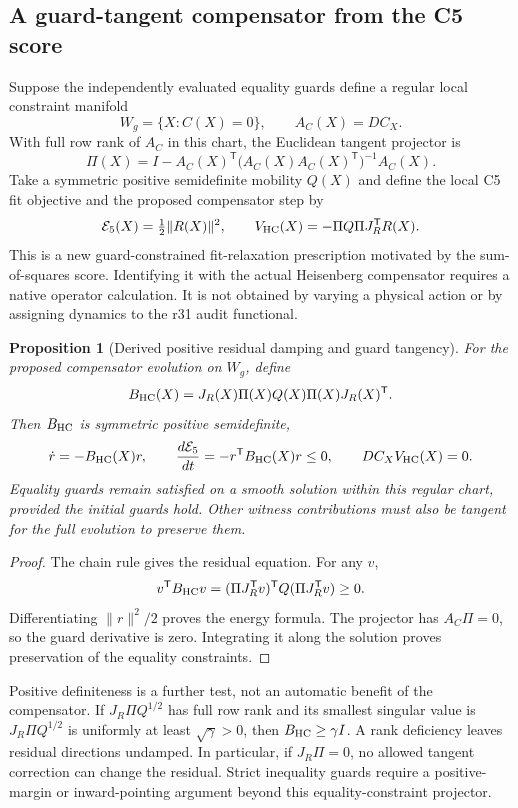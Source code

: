 \documentclass[11pt,a4paper]{article}
\newtheorem{proposition}{Proposition}
\begin{document}
\subsection{A guard-tangent compensator from the C5 score}
Suppose the independently evaluated equality guards define a regular local
constraint manifold
\[
W_g=\{X:C(X)=0\},\qquad A_C(X)=DC_X.
\]
With full row rank of $A_C$ in this chart, the Euclidean tangent projector is
\[
\Pi(X)=I-A_C(X)^{\mathsf T}
\bigl(A_C(X)A_C(X)^{\mathsf T}\bigr)^{-1}A_C(X).
\]
Take a symmetric positive semidefinite mobility $Q(X)$ and define the
local C5 fit objective and the proposed compensator step by
\[
\mathcal E_5(X)=\tfrac12\|R(X)\|^2,
\qquad V_{\rm HC}(X)=-\Pi Q\Pi J_R^{\mathsf T}R(X).
\]
This is a new guard-constrained fit-relaxation prescription motivated by
the sum-of-squares score. Identifying it with the actual Heisenberg
compensator requires a native operator calculation. It is not obtained by
varying a physical action or by assigning dynamics to the r31 audit functional.

\begin{proposition}[Derived positive residual damping and guard tangency]
\label{prop:projected-hc-damping}
For the proposed compensator evolution on $W_g$, define
\[
B_{\rm HC}(X)=J_R(X)\Pi(X)Q(X)\Pi(X)J_R(X)^{\mathsf T}.
\]
Then $B_{\rm HC}$ is symmetric positive semidefinite,
\[
\dot r=-B_{\rm HC}(X)r,\qquad
\frac{d\mathcal E_5}{dt}=-r^{\mathsf T}B_{\rm HC}(X)r\le0,
\qquad DC_X V_{\rm HC}(X)=0.
\]
Equality guards remain satisfied on a smooth solution within this regular
chart, provided the initial guards hold. Other witness contributions must
also be tangent for the full evolution to preserve them.
\end{proposition}
\begin{proof}
The chain rule gives the residual equation. For any $v$,
\[
v^{\mathsf T}B_{\rm HC}v
=(\Pi J_R^{\mathsf T}v)^{\mathsf T}Q(\Pi J_R^{\mathsf T}v)\ge0.
\]
Differentiating $\|r\|^2/2$ proves the energy formula. The projector has
$A_C\Pi=0$, so the guard derivative is zero. Integrating it along the
solution proves preservation of the equality constraints.
\end{proof}

Positive definiteness is a further test, not an automatic benefit of the
compensator. If $J_R\Pi Q^{1/2}$ has full row rank and its smallest singular value is
$J_R\Pi Q^{1/2}$ is uniformly at least $\sqrt\gamma>0$, then
$B_{\rm HC}\ge\gamma I$. A rank deficiency leaves residual directions
undamped. In particular, if $J_R\Pi=0$, no allowed tangent correction can
change the residual. Strict inequality guards require a positive-margin
or inward-pointing argument beyond this equality-constraint projector.
\end{document}
